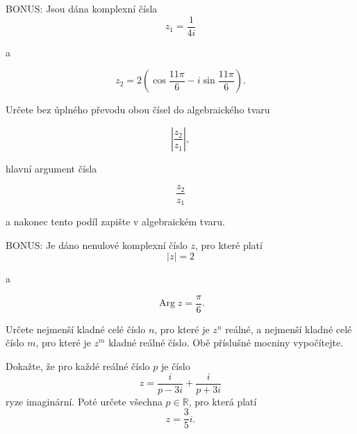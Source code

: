 \documentclass[12pt,a4paper]{article}
\begin{document}
\begin{exercise}
    BONUS: Jsou dána komplexní čísla
    \[
        z_1=\frac{1}{4i}
    \]
    
    a
    
    \[
        z_2=
        2\left(
            \cos\frac{11\pi}{6}
            -
            i\sin\frac{11\pi}{6}
        \right).
    \]
    
    Určete bez úplného převodu obou čísel do algebraického tvaru
    
    \[
        \left|\frac{z_2}{z_1}\right|,
    \]
    
    hlavní argument čísla
    
    \[
        \frac{z_2}{z_1}
    \]
    
    a nakonec tento podíl zapište v algebraickém tvaru.
\end{exercise}


\begin{exercise}
    BONUS: Je dáno nenulové komplexní číslo $z$, pro které platí
    \[
        |z|=2
    \]
    
    a
    
    \[
        \operatorname{Arg}z=\frac{\pi}{6}.
    \]
    
    Určete nejmenší kladné celé číslo $n$, pro které je $z^n$ reálné, a nejmenší
    kladné celé číslo $m$, pro které je $z^m$ kladné reálné číslo. Obě příslušné
    mocniny vypočítejte.
\end{exercise}





\setcounter{section}{6}

\begin{exercise}
    Dokažte, že pro každé reálné číslo $p$ je číslo
    \[
        z=\frac{i}{p-3i}+\frac{i}{p+3i}
    \]
    ryze imaginární. Poté určete všechna $p\in\mathbb{R}$, pro která platí
    \[
        z=\frac35i.
    \]
\end{exercise}
\end{document}

